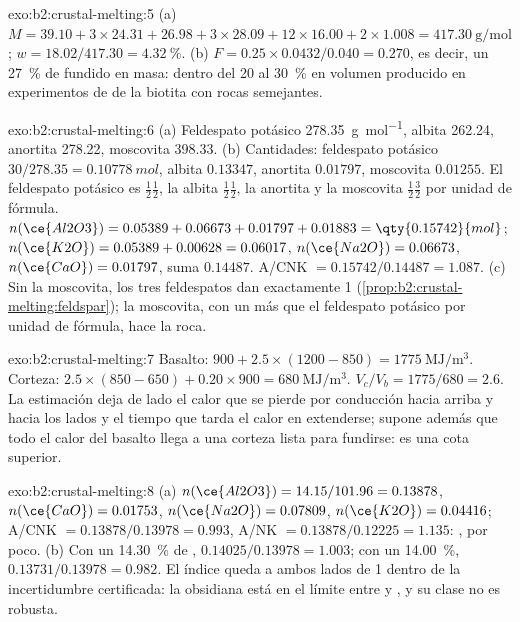 \begin{solution}{exo:b2:crustal-melting:5}
(a) $M = 39.10 + 3\times24.31 + 26.98 + 3\times28.09 + 12\times16.00 + 2\times1.008 =
\qty{417.30}{\gram\per\mole}$; $w = 18.02/417.30 = \qty{4.32}{\percent}$.
(b) $F = 0.25\times0.0432/0.040 = 0.270$, es decir, un \qty{27}{\percent} de fundido en masa: dentro del
20 al \qty{30}{\percent} en volumen producido en experimentos de  de la biotita con
rocas semejantes.
\end{solution}

\begin{solution}{exo:b2:crustal-melting:6}
(a) Feldespato potásico \qty{278.35}{\gram\per\mole}, albita 262.24, anortita 278.22, moscovita
398.33. (b) Cantidades: feldespato potásico $30/278.35 = \qty{0.10778}{mol}$, albita $0.13347$,
anortita $0.01797$, moscovita $0.01255$. El feldespato potásico es $\tfrac12$$\tfrac12$,
la albita $\tfrac12$$\tfrac12$, la anortita  y la moscovita
$\tfrac12$$\tfrac32$ por unidad de fórmula. $n(\ce{Al2O3}) = 0.05389 +
0.06673 + 0.01797 + 0.01883 = \qty{0.15742}{mol}$; $n(\ce{K2O}) = 0.05389 + 0.00628 =
0.06017$, $n(\ce{Na2O}) = 0.06673$, $n(\ce{CaO}) = 0.01797$, suma $0.14487$.
A/CNK $= 0.15742/0.14487 = 1.087$. (c) Sin la moscovita, los tres feldespatos dan
exactamente 1 (\cref{prop:b2:crustal-melting:feldspar}); la moscovita, con un 
más que el feldespato potásico por unidad de fórmula, hace  la roca.
\end{solution}

\begin{solution}{exo:b2:crustal-melting:7}
Basalto: $900 + 2.5\times(1200 - 850) = \qty{1775}{\mega\joule\per\cubic\metre}$. Corteza:
$2.5\times(850 - 650) + 0.20\times900 = \qty{680}{\mega\joule\per\cubic\metre}$.
$V_c/V_b = 1775/680 = 2.6$. La estimación deja de lado el calor que se pierde por conducción
hacia arriba y hacia los lados y el tiempo que tarda el calor en extenderse; supone además que todo el
calor del basalto llega a una corteza lista para fundirse: es una cota superior.
\end{solution}

\begin{solution}{exo:b2:crustal-melting:8}
(a) $n(\ce{Al2O3}) = 14.15/101.96 = 0.13878$, $n(\ce{CaO}) = 0.01753$, $n(\ce{Na2O}) =
0.07809$, $n(\ce{K2O}) = 0.04416$; A/CNK $= 0.13878/0.13978 = 0.993$, A/NK $=
0.13878/0.12225 = 1.135$: , por poco. (b) Con un \qty{14.30}{\percent} de ,
$0.14025/0.13978 = 1.003$; con un \qty{14.00}{\percent}, $0.13731/0.13978 = 0.982$. El índice
queda a ambos lados de 1 dentro de la incertidumbre certificada: la obsidiana está en el
límite entre  y , y su clase no es robusta.
\end{solution}

